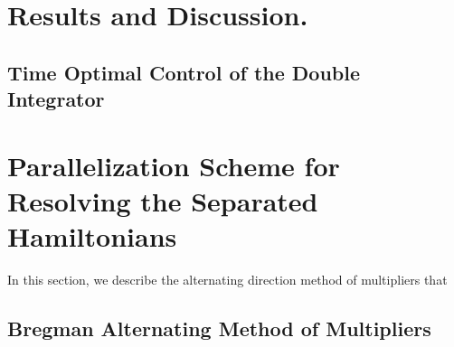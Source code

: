 \section{Results and Discussion.}
\label{sec:results}

\subsection{Time Optimal Control of the Double Integrator}

\section{Parallelization Scheme for Resolving the Separated Hamiltonians}
\label{sec:admm}

In this section, we describe the alternating direction method of multipliers that 

\subsection{Bregman Alternating Method of Multipliers}
\label{sec:badmm}

